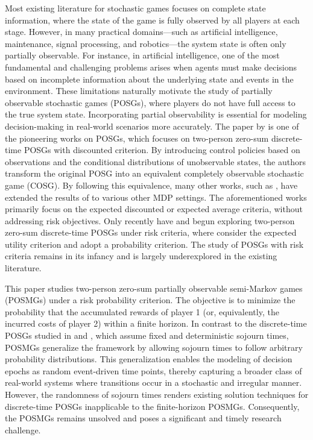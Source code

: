 \documentclass[12pt]{article}
\begin{document}
Most existing literature for stochastic games focuses on complete state information, where the state of the game is fully observed by all players at each stage. However, in many practical domains—such as artificial intelligence, maintenance, signal processing, and robotics—the system state is often only partially observable. For instance, in artificial intelligence, one of the most fundamental and challenging problems arises when agents must make decisions based on incomplete information about the underlying state and events in the environment. These limitations naturally motivate the study of partially observable stochastic games (POSGs), where players do not have full access to the true system state. Incorporating partial observability is essential for modeling decision-making in real-world scenarios more accurately.
The paper by \cite{ghosh2004zero} is one of the pioneering works on POSGs, which focuses on two-person zero-sum discrete-time POSGs with discounted criterion. By introducing control policies based on observations and the conditional distributions of unobservable states, the authors transform the original POSG into an equivalent completely observable stochastic game (COSG). By following this equivalence, many other works, such as \cite{ghosh2006partially, saha2014zero, liu2022sample, yan2024partially}, have extended the results of \cite{ghosh2004zero} to various other MDP settings.
The aforementioned works primarily focus on the expected discounted or expected average criteria, without addressing risk objectives. Only recently  have \cite{bhabak2024partially} and \cite{wei2025partially} begun exploring
two-person zero-sum discrete-time POSGs under risk criteria, where \cite{bhabak2024partially} consider the expected utility criterion and \cite{wei2025partially} adopt a probability criterion. The study of POSGs with risk criteria remains in its infancy  and is largely underexplored in the existing literature.


This paper studies two-person zero-sum  partially observable semi-Markov games (POSMGs) under a risk probability  criterion.  
The objective is to minimize the probability that the accumulated rewards of player 1 (or, equivalently, the incurred costs of player 2) within a finite horizon.  In contrast to the discrete-time POSGs studied in \cite{bhabak2024partially} and \cite{wei2025partially}, which assume fixed and deterministic sojourn times, POSMGs generalize the framework by allowing sojourn times to follow arbitrary probability distributions. This generalization enables the modeling of decision epochs as random event-driven time points, thereby capturing a broader class of real-world systems where transitions occur in a stochastic and irregular manner. However, the randomness of sojourn times renders existing solution techniques for discrete-time POSGs inapplicable to the finite-horizon POSMGs. Consequently, the POSMGs remains unsolved and poses a significant and timely research challenge.
\end{document}
